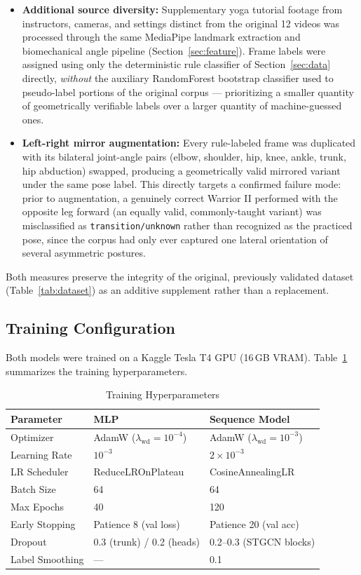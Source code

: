 \documentclass[conference]{IEEEtran}
\begin{document}
\begin{itemize}
\item \textbf{Additional source diversity:} Supplementary yoga tutorial footage from
  instructors, cameras, and settings distinct from the original 12 videos was processed
  through the same MediaPipe landmark extraction and biomechanical angle pipeline
  (Section~\ref{sec:feature}). Frame labels were assigned using only the deterministic
  rule classifier of Section~\ref{sec:data} directly, \emph{without} the auxiliary
  RandomForest bootstrap classifier used to pseudo-label portions of the original corpus
  --- prioritizing a smaller quantity of geometrically verifiable labels over a larger
  quantity of machine-guessed ones.
\item \textbf{Left-right mirror augmentation:} Every rule-labeled frame was duplicated
  with its bilateral joint-angle pairs (elbow, shoulder, hip, knee, ankle, trunk, hip
  abduction) swapped, producing a geometrically valid mirrored variant under the same
  pose label. This directly targets a confirmed failure mode: prior to augmentation, a
  genuinely correct Warrior II performed with the opposite leg forward (an equally valid,
  commonly-taught variant) was misclassified as \texttt{transition/unknown} rather than
  recognized as the practiced pose, since the corpus had only ever captured one lateral
  orientation of several asymmetric postures.
\end{itemize}

\noindent Both measures preserve the integrity of the original, previously validated
dataset (Table~\ref{tab:dataset}) as an additive supplement rather than a replacement.

\subsection{Training Configuration}

Both models were trained on a Kaggle Tesla T4 GPU (16\,GB VRAM). Table~\ref{tab:hyperparam}
summarizes the training hyperparameters.

\begin{table}[ht]
\centering
\caption{Training Hyperparameters}
\label{tab:hyperparam}
\begin{tabular}{@{}lll@{}}
\toprule
\textbf{Parameter} & \textbf{MLP} & \textbf{Sequence Model} \\
\midrule
Optimizer & AdamW ($\lambda_{\mathrm{wd}}=10^{-4}$) & AdamW ($\lambda_{\mathrm{wd}}=10^{-3}$) \\
Learning Rate & $10^{-3}$ & $2 \times 10^{-3}$ \\
LR Scheduler & ReduceLROnPlateau & CosineAnnealingLR \\
Batch Size & 64 & 64 \\
Max Epochs & 40 & 120 \\
Early Stopping & Patience 8 (val loss) & Patience 20 (val acc) \\
Dropout & 0.3 (trunk) / 0.2 (heads) & 0.2--0.3 (STGCN blocks) \\
Label Smoothing & --- & 0.1 \\
\bottomrule
\end{tabular}
\end{table}
\end{document}
